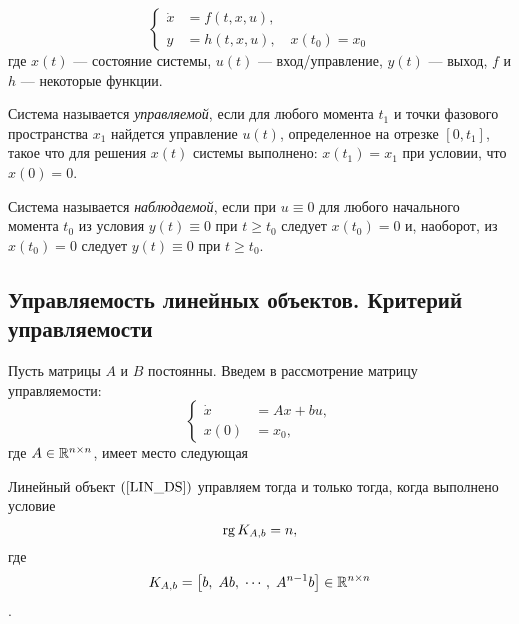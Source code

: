 \documentclass[../../TAU.tex]{subfiles}
\begin{document}
    \begin{equation}\label{GEN_DS}
        \left\{
        \begin{aligned}
            \dot x &= f(t,x,u),\\
            y &= h(t,x,u),\quad x(t_0) = x_0
        \end{aligned}
        \right.
    \end{equation}
    где $x(t)$ --- состояние системы, $u(t)$ --- вход/управление, $y(t)$ --- выход, $f$ и $h$ --- некоторые функции.

    \begin{defi}
        Система  называется {\it управляемой}, если для любого момента $t_1$ и точки фазового пространства $x_1$ найдется управление $u(t)$, определенное на отрезке $[0,t_1]$, такое что для решения $x(t)$ системы  выполнено: $x(t_1) = x_1$ при условии, что $x(0)=0$.
    \end{defi}

    \begin{defi}
        Система  называется {\it наблюдаемой}, если при $u\equiv0$ для любого начального момента $t_0$ из условия $y(t)\equiv 0$ при $t\ge t_0$ следует $x(t_0) = 0$ и, наоборот, из $x(t_0)=0$ следует $y(t)\equiv0$ при $t\ge t_0$.
    \end{defi}

\subsection{Управляемость линейных объектов. Критерий управляемости}

    Пусть матрицы $A$ и $B$ постоянны. Введем в рассмотрение матрицу управляемости:
    \begin{equation}\label{LIN_DS}
        \left\{
        \begin{aligned}
            \dot x &= Ax + bu,\\
            x(0) &= x_0,
        \end{aligned}
        \right.
    \end{equation}
    где $A\in\mathbb{R}^{n\times n}$, имеет место следующая
    \begin{theor}
        Линейный объект $\eref{LIN_DS}$ управляем тогда и только тогда, когда выполнено условие 
        $$
            \mathop{\mathrm{rg}}\nolimits K_{A,b} = n,
        $$
        где
        $$
            K_{A,b} = \left[b,\; Ab,\; \cdots,\; A^{n-1}b\right]\in\mathbb{R}^{n\times n}
        $$.
    \end{theor}
\end{document}
